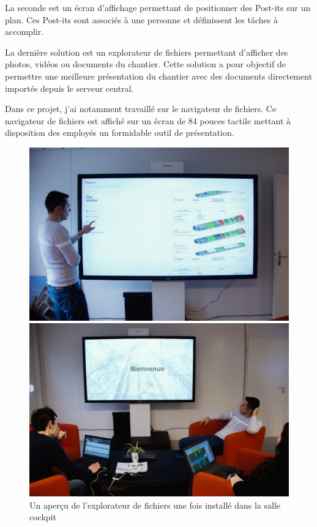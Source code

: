 La seconde est un écran d'affichage permettant de positionner des Post-its sur un plan.
Ces Post-its sont associés à une personne et définissent les tâches à accomplir.

La dernière solution est un explorateur de fichiers permettant d'afficher des photos, vidéos ou documents du chantier.
Cette solution a pour objectif de permettre une meilleure présentation du chantier avec des documents directement importés depuis le serveur central.

\medskip

Dans ce projet, j'ai notamment travaillé sur le navigateur de fichiers.
Ce navigateur de fichiers est affiché sur un écran de 84 pouces tactile mettant à disposition des employés un formidable outil de présentation.

\begin{figure}[h]
    \centering
    \includegraphics[scale=1.2]{img/media-reader-pres-1.jpg}

    \bigskip

    \includegraphics[scale=1.2]{img/media-reader-pres-2.jpg}
    \caption{Un aperçu de l'explorateur de fichiers une fois installé dans la salle cockpit}
\end{figure}

